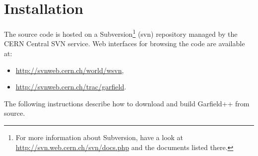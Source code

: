 
\section{Installation}

The source code is hosted on a Subversion\footnote{
For more information about Subversion, 
have a look at \url{http://svn.web.cern.ch/svn/docs.php} and the 
documents listed there.} (svn) repository 
managed by the CERN Central SVN service.
Web interfaces for browsing the code are available at:
\begin{itemize}
  \item
  \url{http://svnweb.cern.ch/world/wsvn},
  \item
  \url{http://svnweb.cern.ch/trac/garfield}.
\end{itemize}

The following instructions describe how to download 
and build Garfield++ from source. 

